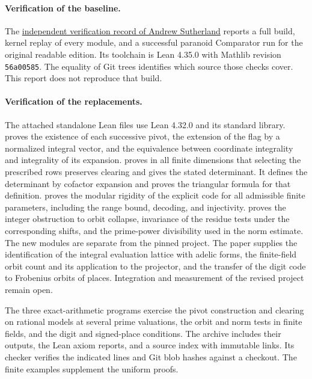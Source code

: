 \paragraph{Verification of the baseline.}
The \href{https://math.mit.edu/~drew/shortgrh/}{independent verification record of Andrew Sutherland} reports a full build, kernel replay of every module, and a successful paranoid Comparator run for the original readable edition. Its toolchain is Lean 4.35.0 with Mathlib revision \texttt{56a00585}. The equality of Git trees identifies which source those checks cover. This report does not reproduce that build.

\paragraph{Verification of the replacements.}
The attached standalone Lean files use Lean 4.32.0 and its standard library.  proves the existence of each successive pivot, the extension of the flag by a normalized integral vector, and the equivalence between coordinate integrality and integrality of its expansion.  proves in all finite dimensions that selecting the prescribed rows preserves clearing and gives the stated determinant. It defines the determinant by cofactor expansion and proves the triangular formula for that definition.  proves the modular rigidity of the explicit code for all admissible finite parameters, including the range bound, decoding, and injectivity.  proves the integer obstruction to orbit collapse, invariance of the residue tests under the corresponding shifts, and the prime-power divisibility used in the norm estimate. The new modules are separate from the pinned project. The paper supplies the identification of the integral evaluation lattice with adelic forms, the finite-field orbit count and its application to the projector, and the transfer of the digit code to Frobenius orbits of places. Integration and measurement of the revised project remain open.

The three exact-arithmetic programs exercise the pivot construction and clearing on rational models at several prime valuations, the orbit and norm tests in finite fields, and the digit and signed-place conditions. The archive includes their outputs, the Lean axiom reports, and a source index with immutable links. Its checker verifies the indicated lines and Git blob hashes against a checkout. The finite examples supplement the uniform proofs.

